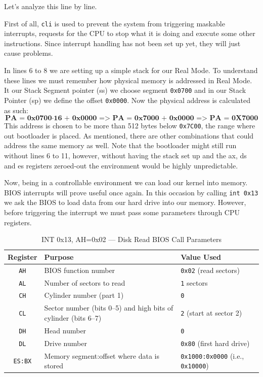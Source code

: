 Let's analyze this line by line. 

First of all, \texttt{cli} is used to prevent the system from triggering maskable interrupts,
requests for the CPU to stop what it is doing and execute some other instructions.
Since interrupt handling has not been set up yet, they will just cause problems.

In lines 6 to 8 we are setting up a simple stack for our Real Mode. To understand these lines we must
remember how physical memory is addressed in Real Mode. It our Stack Segment pointer (ss) we choose segment \texttt{0x0700}
and in our Stack Pointer (sp) we define the offset \texttt{0x0000}. Now the physical address is calculated as such:
\[
\textbf{PA = 0x0700} \cdot \textbf{16 + 0x0000}
\textbf{ => PA = 0x7000 + 0x0000}
\textbf{    => PA = 0X7000}
\]
This address is chosen to be more than 512 bytes below \texttt{0x7C00}, the range where out bootloader is placed.
As mentioned, there are other combinations that could address the same memory as well.
Note that the bootloader might still run without lines 6 to 11, however, without having the stack set up
and the ax, ds and es registers zeroed-out the environment would be highly unpredictable.

Now, being in a controllable environment we can load our kernel into memory. BIOS interrupts will prove useful once again.
In this occasion by calling \texttt{int 0x13} we ask the BIOS to load data from our hard drive into our memory. 
However, before triggering the interrupt we must pass some parameters through CPU registers.

\begin{table}[h]
    \centering
    \begin{tabular}{|c|p{5cm}|p{4cm}|}
    \hline
    \textbf{Register} & \textbf{Purpose} & \textbf{Value Used} \\ \hline
    \texttt{AH} & BIOS function number & \texttt{0x02} (read sectors) \\ \hline
    \texttt{AL} & Number of sectors to read & \texttt{1} sectors \\ \hline
    \texttt{CH} & Cylinder number (part 1) & \texttt{0} \\ \hline
    \texttt{CL} & Sector number (bits 0–5) and high bits of cylinder (bits 6–7) & \texttt{2} (start at sector 2) \\ \hline
    \texttt{DH} & Head number & \texttt{0} \\ \hline
    \texttt{DL} & Drive number & \texttt{0x80} (first hard drive) \\ \hline
    \texttt{ES:BX} & Memory segment:offset where data is stored & \texttt{0x1000:0x0000} (i.e., \texttt{0x10000}) \\ \hline
    \end{tabular}
    \caption{INT 0x13, AH=0x02 — Disk Read BIOS Call Parameters}
    \label{tab:disk_read_params}
\end{table}
    
